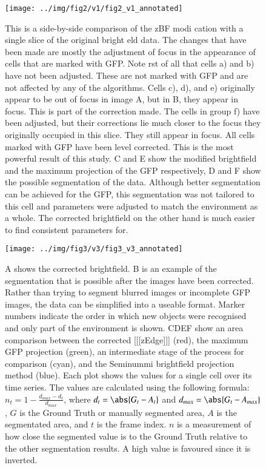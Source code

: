 \documentclass[preprint,11pt,5p,twocolumn]{elsarticle}
\begin{document}
\begin{figure*}
\centering\texttt{[image: ../img/fig2/v1/fig2\_v1\_annotated]}
\label{fig:zbf}
\caption{This is a side-by-side comparison of the zBF modi cation with a single slice of the original bright eld data. The changes that have been made are mostly the adjustment of focus in the appearance of cells that are marked with GFP. Note  rst of all that cells a) and b) have not been adjusted. These are not marked with GFP and are not affected by any of the algorithms. Cells c), d), and e) originally appear to be out of focus in image A, but in B, they appear in focus. This is part of the correction made. The cells in group f) have been adjusted, but their corrections lie much closer to the focus they originally occupied in this slice. They still appear in focus. All cells marked with GFP have been level corrected. This is the most powerful result of this study. C and E show the modified brightfield and the maximum projection of the GFP respectively, D and F show the possible segmentation of the data. Although better segmentation can be achieved for the GFP, this segmentation was not tailored to this cell and parameters were adjusted to match the environment as a whole. The corrected brightfield on the other hand is much easier to find consistent parameters for.}
\end{figure*}

\begin{figure}
\centering\texttt{[image: ../img/fig3/v3/fig3\_v3\_annotated]}
\label{fig:segmentation}
\caption{A shows the corrected brightfield. B is an example of the segmentation that is possible after the images have been corrected. Rather than trying to segment blurred images or incomplete GFP images, the data can be simplified into a useable format. Marker numbers indicate the order in which new objects were recognised and only part of the environment is shown. CDEF show an area comparison between the corrected [[[zEdge]]] (red), the maximum GFP projection (green), an intermediate stage of the process for comparison (cyan), and the Seminummi brightfield projection method (blue). Each plot shows the values for a single cell over its time series. The values are calculated using the following formula: $n_t = 1 - \frac{d_{max} - d_t}{d_{max}}$, where $d_t = \abs{G_t - A_t}$ and $d_{max} = \abs{G_t - A_{max}}$, $G$ is the Ground Truth or manually segmented area, $A$ is the segmentated area, and $t$ is the frame index. $n$ is a measurement of how close the segmented value is to the Ground Truth relative to the other segmentation results. A high value is favoured since it is inverted.}
\end{figure}
\end{document}
